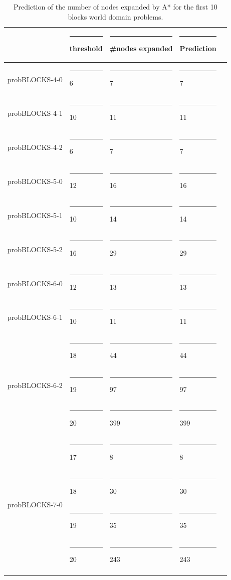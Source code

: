 \documentclass[11pt,a4paper,oneside]{report}
\begin{document}
\footnotesize  %
\setlength\LTleft{100pt}            %
\setlength\LTright{200pt}           %
\begin{longtable}{@{\extracolsep{\fill}} lllll @{}}
\hline
                                &\rule{4pt}{0ex} threshold &\rule{4pt}{0ex} \#nodes expanded &\rule{4pt}{0ex} Prediction \\ \hline
probBLOCKS-4-0                  &\rule{4pt}{0ex} 6         &\rule{4pt}{0ex} 7                &\rule{4pt}{0ex} 7          \\ \hline
probBLOCKS-4-1                  &\rule{4pt}{0ex} 10        &\rule{4pt}{0ex} 11               &\rule{4pt}{0ex} 11         \\ \hline
probBLOCKS-4-2                  &\rule{4pt}{0ex} 6         &\rule{4pt}{0ex} 7                &\rule{4pt}{0ex} 7          \\ \hline
probBLOCKS-5-0                  &\rule{4pt}{0ex} 12        &\rule{4pt}{0ex} 16               &\rule{4pt}{0ex} 16         \\ \hline
probBLOCKS-5-1                  &\rule{4pt}{0ex} 10        &\rule{4pt}{0ex} 14               &\rule{4pt}{0ex} 14         \\ \hline
probBLOCKS-5-2                  &\rule{4pt}{0ex} 16        &\rule{4pt}{0ex} 29               &\rule{4pt}{0ex} 29         \\ \hline
probBLOCKS-6-0                  &\rule{4pt}{0ex} 12        &\rule{4pt}{0ex} 13               &\rule{4pt}{0ex} 13         \\ \hline
probBLOCKS-6-1                  &\rule{4pt}{0ex} 10        &\rule{4pt}{0ex} 11               &\rule{4pt}{0ex} 11         \\ \hline
\multirow{3}{*}{probBLOCKS-6-2} &\rule{4pt}{0ex} 18        &\rule{4pt}{0ex} 44               &\rule{4pt}{0ex} 44         \\ \cline{2-4} 
                                &\rule{4pt}{0ex} 19        &\rule{4pt}{0ex} 97               &\rule{4pt}{0ex} 97         \\ \cline{2-4} 
                                &\rule{4pt}{0ex} 20        &\rule{4pt}{0ex} 399              &\rule{4pt}{0ex} 399        \\ \hline
\multirow{4}{*}{probBLOCKS-7-0} &\rule{4pt}{0ex} 17        &\rule{4pt}{0ex} 8                &\rule{4pt}{0ex} 8          \\ \cline{2-4} 
                                &\rule{4pt}{0ex} 18        &\rule{4pt}{0ex} 30               &\rule{4pt}{0ex} 30         \\ \cline{2-4} 
                                &\rule{4pt}{0ex} 19        &\rule{4pt}{0ex} 35               &\rule{4pt}{0ex} 35         \\ \cline{2-4} 
                                &\rule{4pt}{0ex} 20        &\rule{4pt}{0ex} 243              &\rule{4pt}{0ex} 243        \\ \hline
\caption{Prediction of the number of nodes expanded by A* for the first 10 blocks world domain problems.}
\label{table:predictionDijkstra}
\end{longtable}
\end{document}
